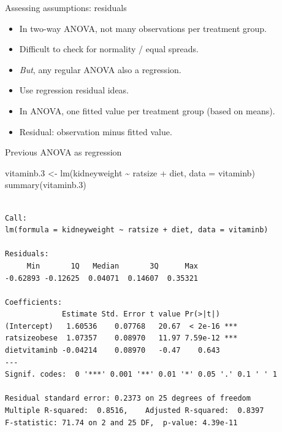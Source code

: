 \documentclass[
  ignorenonframetext,
]{beamer}
\newenvironment{Shaded}{\begin{snugshade}}{\end{snugshade}}
\newcommand{\AttributeTok}[1]{\textcolor[rgb]{0.40,0.45,0.13}{#1}}
\newcommand{\FloatTok}[1]{\textcolor[rgb]{0.68,0.00,0.00}{#1}}
\newcommand{\FunctionTok}[1]{\textcolor[rgb]{0.28,0.35,0.67}{#1}}
\newcommand{\NormalTok}[1]{\textcolor[rgb]{0.00,0.23,0.31}{#1}}
\newcommand{\OtherTok}[1]{\textcolor[rgb]{0.00,0.23,0.31}{#1}}
\newcommand{\SpecialCharTok}[1]{\textcolor[rgb]{0.37,0.37,0.37}{#1}}
\providecommand{\tightlist}{%
  \setlength{\itemsep}{0pt}\setlength{\parskip}{0pt}}\usepackage{longtable,booktabs,array}
\begin{document}
\begin{frame}{Assessing assumptions: residuals}
\protect\hypertarget{assessing-assumptions-residuals}{}
\begin{itemize}
\tightlist
\item
  In two-way ANOVA, not many observations per treatment group.
\item
  Difficult to check for normality / equal spreads.
\item
  \emph{But}, any regular ANOVA also a regression.
\item
  Use regression residual ideas.
\item
  In ANOVA, one fitted value per treatment group (based on means).
\item
  Residual: observation minus fitted value.
\end{itemize}
\end{frame}

\begin{frame}[fragile]{Previous ANOVA as regression}
\protect\hypertarget{previous-anova-as-regression}{}
\scriptsize

\begin{Shaded}
\begin{Highlighting}[]
\NormalTok{vitaminb}\FloatTok{.3} \OtherTok{\textless{}{-}} \FunctionTok{lm}\NormalTok{(kidneyweight }\SpecialCharTok{\textasciitilde{}}\NormalTok{ ratsize }\SpecialCharTok{+}\NormalTok{ diet, }\AttributeTok{data =}\NormalTok{ vitaminb)}
\FunctionTok{summary}\NormalTok{(vitaminb}\FloatTok{.3}\NormalTok{)}
\end{Highlighting}
\end{Shaded}

\begin{verbatim}

Call:
lm(formula = kidneyweight ~ ratsize + diet, data = vitaminb)

Residuals:
     Min       1Q   Median       3Q      Max 
-0.62893 -0.12625  0.04071  0.14607  0.35321 

Coefficients:
             Estimate Std. Error t value Pr(>|t|)    
(Intercept)   1.60536    0.07768   20.67  < 2e-16 ***
ratsizeobese  1.07357    0.08970   11.97 7.59e-12 ***
dietvitaminb -0.04214    0.08970   -0.47    0.643    
---
Signif. codes:  0 '***' 0.001 '**' 0.01 '*' 0.05 '.' 0.1 ' ' 1

Residual standard error: 0.2373 on 25 degrees of freedom
Multiple R-squared:  0.8516,    Adjusted R-squared:  0.8397 
F-statistic: 71.74 on 2 and 25 DF,  p-value: 4.39e-11
\end{verbatim}

\normalsize
\end{frame}
\end{document}
